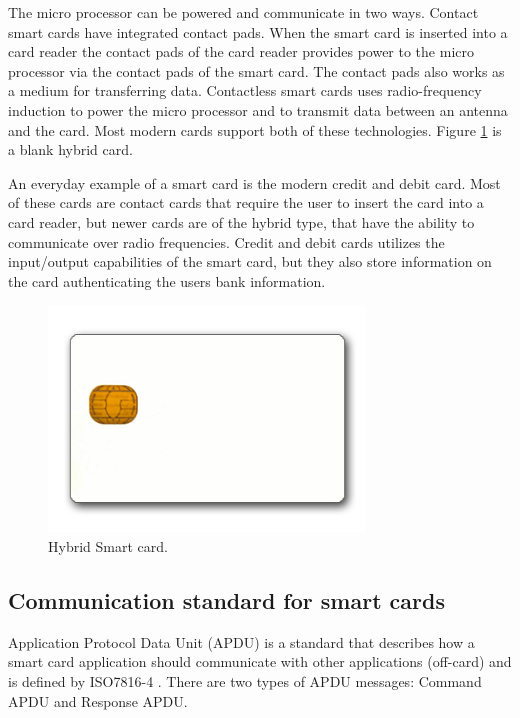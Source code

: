 The micro processor can be powered and communicate in two ways. Contact smart cards have integrated contact pads. When the smart card is inserted into a card reader the contact pads of the card reader provides power to the micro processor via the contact pads of the smart card. The contact pads also works as a medium for transferring data. Contactless smart cards uses radio-frequency induction to power the micro processor and to transmit data between an antenna and the card. Most modern cards support both of these technologies. Figure \ref{fig:nfccard} is a blank hybrid card.

An everyday example of a smart card is the modern credit and debit card. Most of these cards are contact cards that require the user to insert the card into a card reader, but newer cards are of the hybrid type, that have the ability to communicate over radio frequencies. Credit and debit cards utilizes the input/output capabilities of the smart card, but they also store information on the card authenticating the users bank information.

\begin{figure}[h!]
  \caption{Hybrid Smart card.}
  \label{fig:nfccard}
  \centering
    \includegraphics[width=0.75\textwidth]{images/nfccard2.png}
\end{figure}

\subsection{Communication standard for smart cards}
\label{sec:communicationstandard}
Application Protocol Data Unit (APDU) is a standard that describes how a smart card application should communicate with other applications (off-card) and is defined by ISO7816-4 \cite{iso7816-4}. There are two types of APDU messages: Command APDU and Response APDU.

